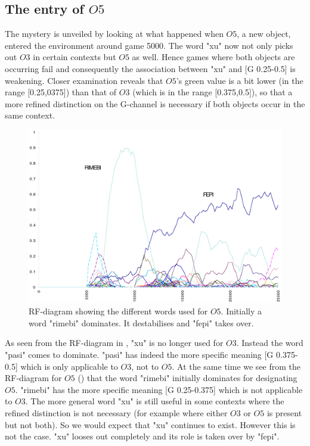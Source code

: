 \subsection{The entry of $O5$}

The mystery is unveiled by looking at what
happened when $O5$, a new object, entered the environment 
around game 5000. The word "xu" now not only picks out
$O3$ in certain contexts but $O5$ as well. Hence 
games where both objects are occurring fail and consequently 
the association between "xu" and [G 0.25-0.5] is 
weakening. Closer examination reveals that $O5$'s green value
is a bit lower (in the range [0.25,0375]) than that of $O3$
(which is in the range [0.375,0.5]), so that a more refined
distinction on the G-channel is necessary if both objects
occur in the same context. 

\begin{figure}[htbp]
  \centerline{\includegraphics[width=.80\textwidth]{chap7/figs/RF-O5}}
\caption{ \label{RF-O5} RF-diagram showing
the different words used for $O5$. Initially a word 
"rimebi" dominates. It destabilises and "fepi" takes over.}
\end{figure}

As seen from the RF-diagram in , "xu" is no
longer used for $O3$. Instead the word "pasi" comes to 
dominate. "pasi" has indeed the more specific 
meaning [G 0.375-0.5] which is only applicable to $O3$, 
not to $O5$. At the same time we see from the RF-diagram 
for $O5$ ()
that the word "rimebi" initially dominates for designating $O5$. 
"rimebi" has the more specific meaning [G 0.25-0.375] which 
is not applicable to $O3$. 
The more general word "xu" is still useful in some 
contexts where the
refined distinction is not necessary (for example where 
either $O3$ or $O5$ is present but not both). So we would expect
that "xu" continues to exist. However this is not the case. "xu"
looses out completely and its role is taken over by "fepi". 

